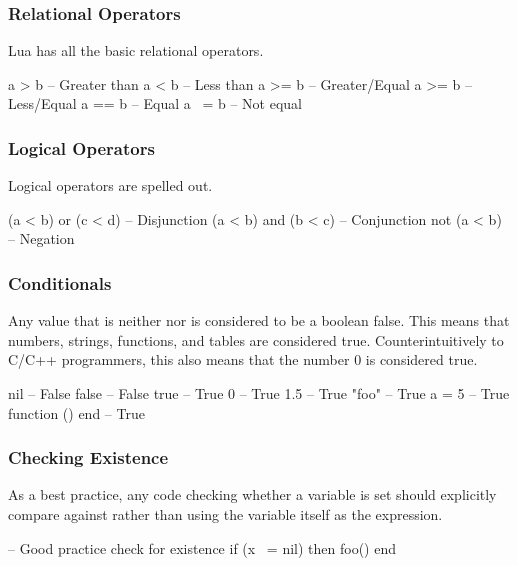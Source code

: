 \subsubsection{Relational Operators}

Lua has all the basic relational operators.

\begin{LuaCode}
a > b  -- Greater than
a < b  -- Less than
a >= b -- Greater/Equal
a >= b -- Less/Equal
a == b -- Equal
a ~= b -- Not equal
\end{LuaCode}

\subsubsection{Logical Operators}

Logical operators are spelled out.

\begin{LuaCode}
(a < b) or (c < d)  -- Disjunction
(a < b) and (b < c) -- Conjunction
not (a < b)         -- Negation
\end{LuaCode}

\subsubsection{Conditionals}

Any value that is neither  nor  is considered to be
a boolean false.  This means that numbers, strings, functions, and tables are
considered true.  Counterintuitively to C/C++ programmers, this also means that
the number 0 is considered true.

\begin{LuaCode}
nil             -- False
false           -- False
true            -- True
0               -- True
1.5             -- True
"foo"           -- True
{ a = 5 }       -- True
function () end -- True
\end{LuaCode}

\subsubsection{Checking Existence}

As a best practice, any code checking whether a variable is set should
explicitly compare against  rather than using the variable itself
as the expression.

\begin{LuaCode}
-- Good practice check for existence
if (x ~= nil) then
	foo()
end
\end{LuaCode}

